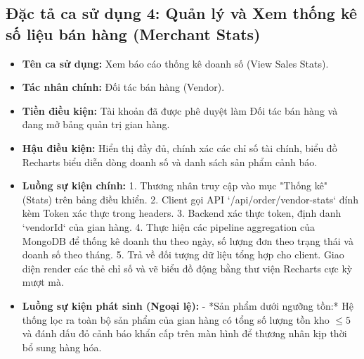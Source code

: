 \documentclass[../DoAn.tex]{subfiles}
\begin{document}
\subsection{Đặc tả ca sử dụng 4: Quản lý và Xem thống kê số liệu bán hàng (Merchant Stats)}
\begin{itemize}
\item \textbf{Tên ca sử dụng:} Xem báo cáo thống kê doanh số (View Sales Stats).
\item \textbf{Tác nhân chính:} Đối tác bán hàng (Vendor).
\item \textbf{Tiền điều kiện:} Tài khoản đã được phê duyệt làm Đối tác bán hàng và đang mở bảng quản trị gian hàng.
\item \textbf{Hậu điều kiện:} Hiển thị đầy đủ, chính xác các chỉ số tài chính, biểu đồ Recharts biểu diễn dòng doanh số và danh sách sản phẩm cảnh báo.
\item \textbf{Luồng sự kiện chính:}
  1. Thương nhân truy cập vào mục "Thống kê" (Stats) trên bảng điều khiển.
  2. Client gọi API `/api/order/vendor-stats` đính kèm Token xác thực trong headers.
  3. Backend xác thực token, định danh `vendorId` của gian hàng.
  4. Thực hiện các pipeline aggregation của MongoDB để thống kê doanh thu theo ngày, số lượng đơn theo trạng thái và doanh số theo tháng.
  5. Trả về đối tượng dữ liệu tổng hợp cho client. Giao diện render các thẻ chỉ số và vẽ biểu đồ động bằng thư viện Recharts cực kỳ mượt mà.
\item \textbf{Luồng sự kiện phát sinh (Ngoại lệ):}
  - *Sản phẩm dưới ngưỡng tồn:* Hệ thống lọc ra toàn bộ sản phẩm của gian hàng có tổng số lượng tồn kho $\le 5$ và đánh dấu đỏ cảnh báo khẩn cấp trên màn hình để thương nhân kịp thời bổ sung hàng hóa.
\end{itemize}
\end{document}

